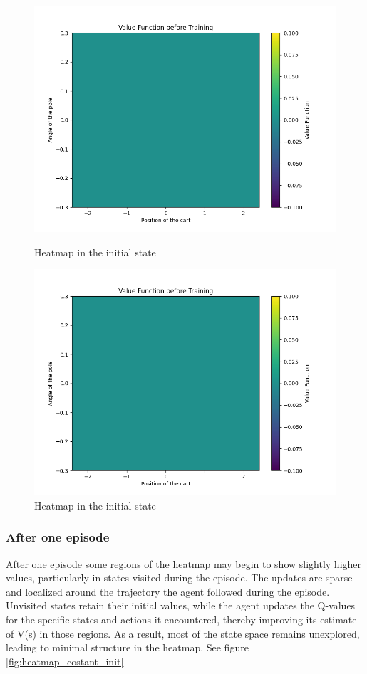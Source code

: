 \documentclass{article}
\begin{document}
\begin{figure}[!htb]
	\begin{minipage}{0.48\textwidth}
		\centering
		\includegraphics[width=0.5\linewidth]{../data/plot/heatmap_initial_training_constant_0.2.png}
		\caption{Heatmap in the initial state}
		\label{fig:heatmap_init}
	\end{minipage}\hfill
	\begin{minipage}{0.48\textwidth}
		\centering
		\includegraphics[width=0.5\linewidth]{../data/plot/heatmap_initial_training_glie.png}
		\caption{Heatmap in the initial state}
		\label{fig:heatmap_init}
	\end{minipage}
\end{figure}



\subsubsection{After one episode}
After one episode some regions of the heatmap may begin to show slightly higher values, particularly in states visited during the episode. The updates are sparse and localized around the trajectory the agent followed during the episode. 
Unvisited states retain their initial values, while the agent updates the Q-values for the specific states and actions it encountered, thereby improving its estimate of  V(s)  in those regions.
As a result, most of the state space remains unexplored, leading to minimal structure in the heatmap. See figure \ref{fig:heatmap_costant_init}
\end{document}
